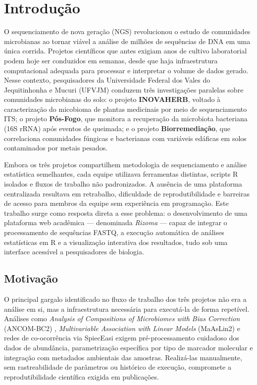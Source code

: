 \chapter{Introdução}
\label{cap:introducao}

O sequenciamento de nova geração (NGS) revolucionou o estudo de
comunidades microbianas ao tornar viável a análise de milhões de
sequências de DNA em uma única corrida. Projetos científicos que antes
exigiam anos de cultivo laboratorial podem hoje ser conduzidos em
semanas, desde que haja infraestrutura computacional adequada para
processar e interpretar o volume de dados gerado. Nesse contexto,
pesquisadores da Universidade Federal dos Vales do Jequitinhonha e
Mucuri (UFVJM) conduzem três investigações paralelas sobre comunidades
microbianas do solo: o projeto \textbf{INOVAHERB}, voltado à
caracterização do micobioma de plantas medicinais por meio de
sequenciamento ITS; o projeto \textbf{Pós-Fogo}, que monitora a
recuperação da microbiota bacteriana (16S rRNA) após eventos de
queimada; e o projeto \textbf{Biorremediação}, que correlaciona
comunidades fúngicas e bacterianas com variáveis edáficas em solos
contaminados por metais pesados.

Embora os três projetos compartilhem metodologia de sequenciamento e
análise estatística semelhantes, cada equipe utilizava ferramentas
distintas, scripts R isolados e fluxos de trabalho não padronizados.
A ausência de uma plataforma centralizada resultava em retrabalho,
dificuldade de reprodutibilidade e barreiras de acesso para membros da
equipe sem experiência em programação. Este trabalho surge como
resposta direta a esse problema: o desenvolvimento de uma plataforma
web acadêmica — denominada \textit{Rizoma} — capaz de integrar
o processamento de sequências FASTQ, a execução automática de análises
estatísticas em R e a visualização interativa dos resultados, tudo
sob uma interface acessível a pesquisadores de biologia.

\section{Motivação}

O principal gargalo identificado no fluxo de trabalho dos três
projetos não era a análise em si, mas a infraestrutura necessária para
executá-la de forma repetível. Análises como \textit{Analysis of
Compositions of Microbiomes with Bias Correction} (ANCOM-BC2)
\cite{lin2022analysis}, \textit{Multivariable Association with Linear
Models} (MaAsLin2) \cite{mallick2021multivariable} e redes de
co-ocorrência via SpiecEasi \cite{kurtz2015sparse} exigem
pré-processamento cuidadoso dos dados de abundância, parametrização
específica por tipo de marcador molecular e integração com metadados
ambientais das amostras. Realizá-las manualmente, sem rastreabilidade
de parâmetros ou histórico de execução, compromete a reprodutibilidade
científica exigida em publicações.


